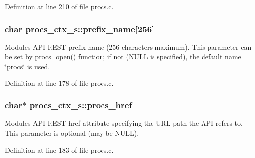 Definition at line 210 of file procs.\+c.

\subsubsection[{\texorpdfstring{prefix\+\_\+name}{prefix_name}}]{\setlength{\rightskip}{0pt plus 5cm}char procs\+\_\+ctx\+\_\+s\+::prefix\+\_\+name\mbox{[}256\mbox{]}}\hypertarget{structprocs__ctx__s_a00c43e06f8805e3c392802956a3c0fce}{}\label{structprocs__ctx__s_a00c43e06f8805e3c392802956a3c0fce}
Module\textquotesingle{}s A\+PI R\+E\+ST prefix name (256 characters maximum). This parameter can be set by \textquotesingle{}\hyperlink{procs_8c_ac44b6ac931afbeadeb7f07b660e30bac}{procs\+\_\+open()}\textquotesingle{} function; if not (N\+U\+LL is specified), the default name \char`\"{}procs\char`\"{} is used. 

Definition at line 178 of file procs.\+c.

\subsubsection[{\texorpdfstring{procs\+\_\+href}{procs_href}}]{\setlength{\rightskip}{0pt plus 5cm}char$\ast$ procs\+\_\+ctx\+\_\+s\+::procs\+\_\+href}\hypertarget{structprocs__ctx__s_adb507582e7611d94d41bfaafd244b99a}{}\label{structprocs__ctx__s_adb507582e7611d94d41bfaafd244b99a}
Module\textquotesingle{}s A\+PI R\+E\+ST href attribute specifying the U\+RL path the A\+PI refers to. This parameter is optional (may be N\+U\+LL). 

Definition at line 183 of file procs.\+c.

